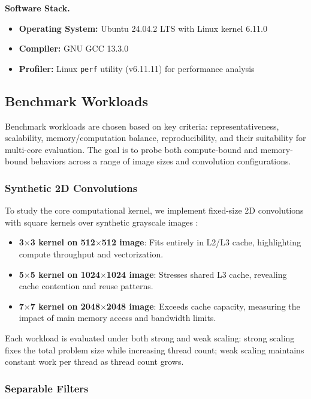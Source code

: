\documentclass[conference, 10pt]{IEEEtran}
\begin{document}
\textbf{Software Stack.}
\begin{itemize}
    \item \textbf{Operating System:} Ubuntu 24.04.2 LTS with Linux kernel 6.11.0
    \item \textbf{Compiler:} GNU GCC 13.3.0
    \item \textbf{Profiler:} Linux \texttt{perf} utility (v6.11.11) for performance analysis
\end{itemize}



\subsection{Benchmark Workloads}

Benchmark workloads are chosen based on key criteria: representativeness, scalability, memory/computation balance, reproducibility, and their suitability for multi-core evaluation. The goal is to probe both compute-bound and memory-bound behaviors across a range of image sizes and convolution configurations.

\subsubsection{Synthetic 2D Convolutions}

To study the core computational kernel, we implement fixed-size 2D convolutions with square kernels over synthetic grayscale images \cite{Tousimojarad2017}:

\begin{itemize}
    \item \textbf{3$\times$3 kernel on 512$\times$512 image}: Fits entirely in L2/L3 cache, highlighting compute throughput and vectorization.
    \item \textbf{5$\times$5 kernel on 1024$\times$1024 image}: Stresses shared L3 cache, revealing cache contention and reuse patterns.
    \item \textbf{7$\times$7 kernel on 2048$\times$2048 image}: Exceeds cache capacity, measuring the impact of main memory access and bandwidth limits.
\end{itemize}

Each workload is evaluated under both strong and weak scaling: strong scaling fixes the total problem size while increasing thread count; weak scaling maintains constant work per thread as thread count grows.

\subsubsection{Separable Filters}
\end{document}
